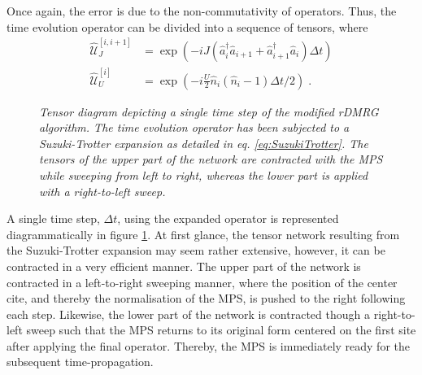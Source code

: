 Once again, the error is due to the non-commutativity of operators. Thus, the time evolution operator can be divided into a sequence of tensors, where
\begin{align}
	\hat{\mathcal{U}}_{J}^{[i,i+1]} &= \exp \left( -i J ( \hat{a}_{i}^{\dag} \hat{a}_{i+1} + \hat{a}_{i+1}^{\dag} \hat{a}_{i} ) \Delta t \right) \\
	\hat{\mathcal{U}}_{U}^{[i]} &= \exp \left( -i \frac{U}{2} \hat{n}_i (\hat{n}_i -1) \Delta t /2 \right) \; .
\end{align}
\begin{figure}[h!]
	\centering
	
	\caption{\textit{Tensor diagram depicting a single time step of the modified rDMRG algorithm. The time evolution operator has been subjected to a Suzuki-Trotter expansion as detailed in eq. \eqref{eq:SuzukiTrotter}. The tensors of the upper part of the network are contracted with the MPS while sweeping from left to right, whereas the lower part is applied with a right-to-left sweep.}}
	\label{fig:ModifiedTEBD}
\end{figure}
A single time step, $\Delta t$, using the expanded operator is represented diagrammatically in figure \ref{fig:ModifiedTEBD}. At first glance, the tensor network resulting from the Suzuki-Trotter expansion may seem rather extensive, however, it can be contracted in a very efficient manner. The upper part of the network is contracted in a left-to-right sweeping manner, where the position of the center cite, and thereby the normalisation of the MPS, is pushed to the right following each step. Likewise, the lower part of the network is contracted though a right-to-left sweep such that the MPS returns to its original form centered on the first site after applying the final operator. Thereby, the MPS is immediately ready for the subsequent time-propagation.\\
